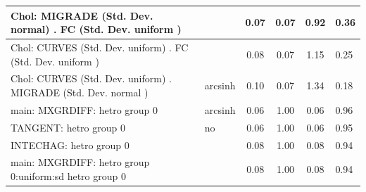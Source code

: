 \begin{table}
\begin{center}
\begin{tabular}{|l|l|c|c|c|l|}
			\hline
			 Chol: MIGRADE (Std. Dev. normal) . FC (Std. Dev.   uniform ) &  & 0.07 & 0.07 & 0.92 & 0.36 \\
			\hline
			 Chol: CURVES (Std. Dev. uniform) . FC (Std. Dev.   uniform ) &  & 0.08 & 0.07 & 1.15 & 0.25 \\
			\hline
			 Chol: CURVES (Std. Dev. uniform) . MIGRADE (Std. Dev.   normal ) & arcsinh & 0.10 & 0.07 & 1.34 & 0.18 \\
			\hline
			main: MXGRDIFF: hetro group 0 & arcsinh & 0.06 & 1.00 & 0.06 & 0.96 \\
			\hline
			TANGENT: hetro group 0 & no & 0.06 & 1.00 & 0.06 & 0.95 \\
			\hline
			INTECHAG: hetro group 0 &  & 0.08 & 1.00 & 0.08 & 0.94 \\
			\hline
			main: MXGRDIFF: hetro group 0:uniform:sd  hetro group 0 &  & 0.08 & 1.00 & 0.08 & 0.94 \\
			\hline
		\end{tabular}
	\end{center}
\end{table}